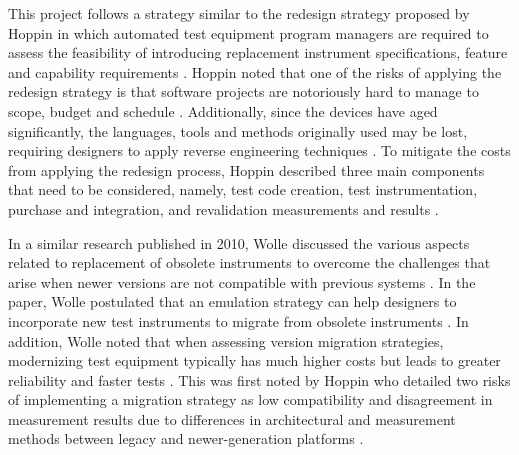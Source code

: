 \documentclass[class=report,11pt,crop=false]{standalone}
\begin{document}
This project follows a strategy similar to the redesign strategy proposed by Hoppin in which automated test equipment program managers are required to assess the feasibility of introducing replacement instrument specifications, feature and capability requirements \cite{hoppin2002}. Hoppin noted that one of the risks of applying the redesign strategy is that software projects are notoriously hard to manage to scope, budget and schedule \cite{hoppin2002}. Additionally, since the devices have aged significantly, the languages, tools and methods originally used may be lost, requiring designers to apply reverse engineering techniques \cite{hoppin2002}. To mitigate the costs from applying the redesign process, Hoppin described three main components that need to be considered, namely, test code creation, test instrumentation, purchase and integration, and revalidation measurements and results \cite{hoppin2002}. 

In a similar research published in 2010, Wolle discussed the various aspects related to replacement of obsolete instruments to overcome the challenges that arise when newer versions are not compatible with previous systems \cite{wolle2010}. In the paper, Wolle postulated that an emulation strategy can help designers to incorporate new test instruments to migrate from obsolete instruments \cite{wolle2010}. In addition, Wolle noted that when assessing version migration strategies, modernizing test equipment typically has much higher costs but leads to greater reliability and faster tests \cite{wolle2010}. This was first noted by Hoppin who detailed two risks of implementing a migration strategy as low compatibility and disagreement in measurement results due to differences in architectural and measurement methods between legacy and newer-generation platforms \cite{hoppin2002}.
\end{document}
